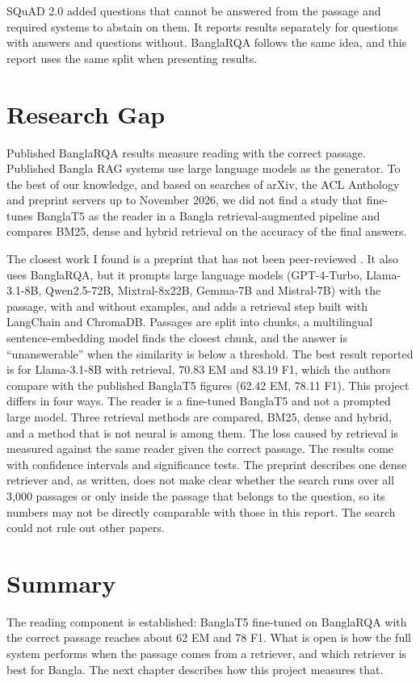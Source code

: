 SQuAD 2.0 \cite{rajpurkar2018squad2} added questions that cannot be answered from the passage and required systems to abstain on them. It reports results separately for questions with answers and questions without. BanglaRQA follows the same idea, and this report uses the same split when presenting results.

\section{Research Gap}

Published BanglaRQA results measure reading with the correct passage. Published Bangla RAG systems use large language models as the generator. To the best of our knowledge, and based on searches of arXiv, the ACL Anthology and preprint servers up to November 2026, we did not find a study that fine-tunes BanglaT5 as the reader in a Bangla retrieval-augmented pipeline and compares BM25, dense and hybrid retrieval on the accuracy of the final answers.

The closest work I found is a preprint that has not been peer-reviewed \cite{raiyan2026bhrerag}. It also uses BanglaRQA, but it prompts large language models (GPT-4-Turbo, Llama-3.1-8B, Qwen2.5-72B, Mixtral-8x22B, Gemma-7B and Mistral-7B) with the passage, with and without examples, and adds a retrieval step built with LangChain and ChromaDB. Passages are split into chunks, a multilingual sentence-embedding model finds the closest chunk, and the answer is ``unanswerable'' when the similarity is below a threshold. The best result reported is for Llama-3.1-8B with retrieval, 70.83 EM and 83.19 F1, which the authors compare with the published BanglaT5 figures (62.42 EM, 78.11 F1). This project differs in four ways. The reader is a fine-tuned BanglaT5 and not a prompted large model. Three retrieval methods are compared, BM25, dense and hybrid, and a method that is not neural is among them. The loss caused by retrieval is measured against the same reader given the correct passage. The results come with confidence intervals and significance tests. The preprint describes one dense retriever and, as written, does not make clear whether the search runs over all 3,000 passages or only inside the passage that belongs to the question, so its numbers may not be directly comparable with those in this report. The search could not rule out other papers.

\section{Summary}

The reading component is established: BanglaT5 fine-tuned on BanglaRQA with the correct passage reaches about 62 EM and 78 F1. What is open is how the full system performs when the passage comes from a retriever, and which retriever is best for Bangla. The next chapter describes how this project measures that.
